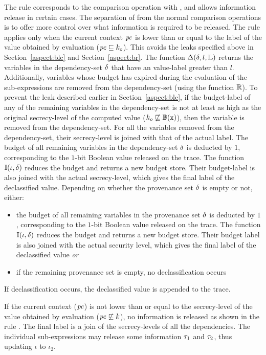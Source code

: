 The  rule corresponds to the comparison operation
with \dec, and allows information release in certain cases. The
separation of  from the normal comparison operations is
to offer more control over what information is required to be
released. The rule applies only when the current context $\mathit{pc}$ is
lower than or equal to the label of the value obtained by evaluation
($\mathit{pc} \sqsubseteq k_o$). This avoids the leaks specified above
in Section~\ref{aspect:blc} and Section~\ref{aspect:br}. The function
$\Delta(\delta, l, \mathbb{L})$ returns the variables in the dependency-set
$\delta$ that have an value-label greater than $l$. Additionally, variables
whose budget has expired during the evaluation of the sub-expressions
are removed from the dependency-set (using the function $\mathbb{R}$). 
To prevent the leak described earlier in Section~\ref{aspect:blc}, if the budget-label of any of
the remaining variables in the dependency-set is not at least as high
as the original secrecy-level of the computed value
($k_o \not\sqsubseteq \mathbb{B}(\texttt{x})$), then the variable is removed
from the dependency-set. For all the variables removed from the
dependency-set, their secrecy-level is joined with that of the actual
label. The budget of all remaining
variables in the dependency-set $\delta$ is deducted by $1$,
corresponding to the $1$-bit Boolean value released on the trace. The
function $\mathbb{I}(\iota, \delta)$ reduces the budget and returns a
new budget store. Their budget-label is also joined with the actual
secrecy-level, which gives the final label of the declassified value.
  Depending on whether the provenance set $\delta$ is empty or not,
  either:  
  \begin{itemize}
  \item the budget of all remaining variables in the provenance set
    $\delta$ is deducted by $1$, corresponding to the $1$-bit Boolean
    value released on the trace. The function $\mathbb{I}(\iota,
    \delta)$ reduces the budget and returns a new budget store. Their
    budget label is also joined  with the actual security level, which
    gives the final label of the declassified value \emph{or}
  \item if the remaining provenance set is empty, no declassification
    occurs
  \end{itemize}
  If declassification occurs, the declassified value is appended to
  the trace.
  
If the current context ($\mathit{pc}$) is not lower than or equal to the 
secrecy-level of the value obtained by evaluation ($\mathit{pc} \not\sqsubseteq k$), 
no information is released as shown in the rule . 
The final label is a join of the secrecy-levels of all the dependencies. 
The individual sub-expressions may release some information $\tau_1$ and 
$\tau_2$, thus updating $\iota$ to $\iota_2$. 

